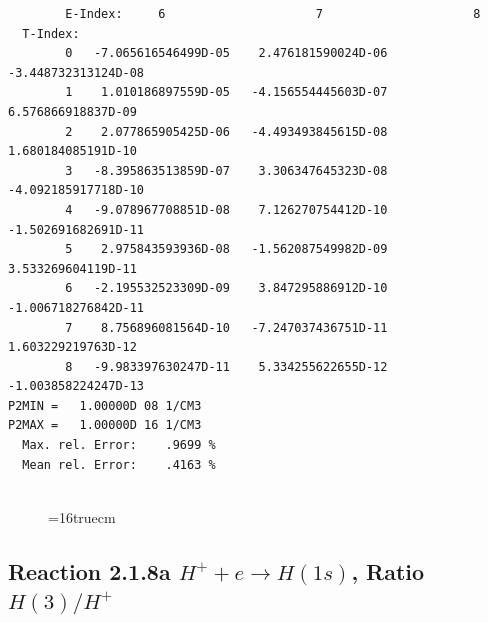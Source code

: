 \documentclass[12pt,dvipdfmx]{article}
\begin{document}
\begin{small}
\begin{verbatim}
        E-Index:     6                     7                     8
  T-Index:
        0   -7.065616546499D-05    2.476181590024D-06   -3.448732313124D-08
        1    1.010186897559D-05   -4.156554445603D-07    6.576866918837D-09
        2    2.077865905425D-06   -4.493493845615D-08    1.680184085191D-10
        3   -8.395863513859D-07    3.306347645323D-08   -4.092185917718D-10
        4   -9.078967708851D-08    7.126270754412D-10   -1.502691682691D-11
        5    2.975843593936D-08   -1.562087549982D-09    3.533269604119D-11
        6   -2.195532523309D-09    3.847295886912D-10   -1.006718276842D-11
        7    8.756896081564D-10   -7.247037436751D-11    1.603229219763D-12
        8   -9.983397630247D-11    5.334255622655D-12   -1.003858224247D-13
P2MIN =   1.00000D 08 1/CM3
P2MAX =   1.00000D 16 1/CM3
  Max. rel. Error:    .9699 %
  Mean rel. Error:    .4163 %


\end{verbatim}\end{small}
\begin{figure} \label{2.1.8_equil}
\epsfxsize=16truecm
\end{figure}
\newpage


\subsection{
Reaction 2.1.8a  $H^+ + e \rightarrow H(1s) $,  Ratio $H(3)/H^+$
}
\end{document}

